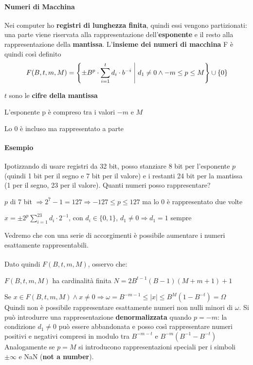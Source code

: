 \documentclass[10pt]{book}
\begin{document}
\paragraph{Numeri di Macchina} Nei computer ho \textbf{registri di lunghezza finita}, quindi essi vengono partizionati: una parte viene riservata alla rappresentazione dell'\textbf{esponente} e il resto alla rappresentazione della \textbf{mantissa}. L'\textbf{insieme dei numeri di macchina} F è quindi così definito
$$F(B, t, m, M) = \left\{\pm B^p \cdot \sum_{i=1}^t d_i \cdot b^{-i}\:\:\vline\:\: d_1 \neq 0 \wedge -m \leq p \leq M\right\} \cup \{0\}$$
\begin{list}{}{dove}
	\item $t$ sono le \textbf{cifre della mantissa}
	\item L'esponente p è compreso tra i valori $-m$ e $M$
	\item Lo 0 è incluso ma rappresentato a parte
\end{list}
\paragraph{Esempio} Ipotizzando di usare registri da 32 bit, posso stanziare 8 bit per l'esponente $p$ (quindi 1 bit per il segno e 7 bit per il valore) e i restanti 24 bit per la mantissa (1 per il segno, 23 per il valore). Quanti numeri posso rappresentare?
\begin{list}{}{}
	\item $p$ di 7 bit $\Rightarrow 2^7 - 1 = 127 \Rightarrow -127 \leq p \leq 127$ ma lo 0 è rappresentato due volte
	\item $x = \pm2^p \sum_{i=1}^23 d_i \cdot 2^{-1}$, con $d_i \in \{0, 1\}$, $d_1 \neq 0 \Rightarrow d_1 = 1$ sempre
\end{list}
Vedremo che con una serie di accorgimenti è possibile aumentare i numeri esattamente rappresentabili.\\\\
Dato quindi $F(B, t, m, M)$, osservo che:
\begin{list}{}{}
	\item $F(B, t, m, M)$ ha cardinalità finita $N = 2B^{t-1}(B - 1)(M + m + 1) + 1$
	\item Se $x \in F(B, t, m, M) \wedge x \neq 0 \Rightarrow \omega = B^{-m-1} \leq |x| \leq B^M(1 - B^{-t}) = \Omega$\\
	Quindi non è possibile rappresentare esattamente numeri non nulli minori di $\omega$. Si può introdurre una rappresentazione \textbf{denormalizzata} quando $p = -m$: la condizione $d_1 \neq 0$ può essere abbandonata e posso così rappresentare numeri positivi e negativi compresi in modulo tra $B^{-m-t}$ e $B^{-m}(B^{-1} - B^{-t})$\\
	Analogamente se $p = M$ si introducono rappresentazioni speciali per i simboli $\pm\infty$ e NaN (\textbf{not a number}).
\end{list}
\end{document}
